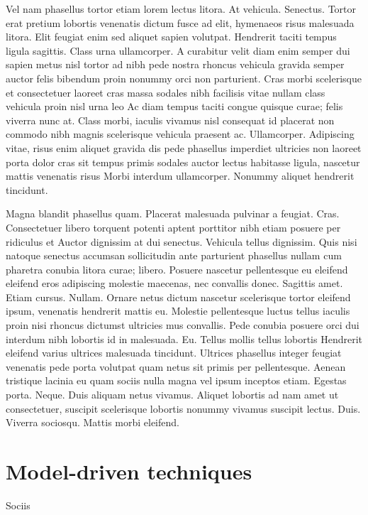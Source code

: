 Vel nam phasellus tortor etiam lorem lectus litora. At vehicula. Senectus. Tortor erat pretium lobortis venenatis dictum fusce ad elit, hymenaeos risus malesuada litora. Elit feugiat enim sed aliquet sapien volutpat. Hendrerit taciti tempus ligula sagittis. Class urna ullamcorper. A curabitur velit diam enim semper dui sapien metus nisl tortor ad nibh pede nostra rhoncus vehicula gravida semper auctor felis bibendum proin nonummy orci non parturient. Cras morbi scelerisque et consectetuer laoreet cras massa sodales nibh facilisis vitae nullam class vehicula proin nisl urna leo Ac diam tempus taciti congue quisque curae; felis viverra nunc at. Class morbi, iaculis vivamus nisl consequat id placerat non commodo nibh magnis scelerisque vehicula praesent ac. Ullamcorper. Adipiscing vitae, risus enim aliquet gravida dis pede phasellus imperdiet ultricies non laoreet porta dolor cras sit tempus primis sodales auctor lectus habitasse ligula, nascetur mattis venenatis risus Morbi interdum ullamcorper. Nonummy aliquet hendrerit tincidunt.

Magna blandit phasellus quam. Placerat malesuada pulvinar a feugiat. Cras. Consectetuer libero torquent potenti aptent porttitor nibh etiam posuere per ridiculus et Auctor dignissim at dui senectus. Vehicula tellus dignissim. Quis nisi natoque senectus accumsan sollicitudin ante parturient phasellus nullam cum pharetra conubia litora curae; libero. Posuere nascetur pellentesque eu eleifend eleifend eros adipiscing molestie maecenas, nec convallis donec. Sagittis amet. Etiam cursus. Nullam. Ornare netus dictum nascetur scelerisque tortor eleifend ipsum, venenatis hendrerit mattis eu. Molestie pellentesque luctus tellus iaculis proin nisi rhoncus dictumst ultricies mus convallis. Pede conubia posuere orci dui interdum nibh lobortis id in malesuada. Eu. Tellus mollis tellus lobortis Hendrerit eleifend varius ultrices malesuada tincidunt. Ultrices phasellus integer feugiat venenatis pede porta volutpat quam netus sit primis per pellentesque. Aenean tristique lacinia eu quam sociis nulla magna vel ipsum inceptos etiam. Egestas porta. Neque. Duis aliquam netus vivamus. Aliquet lobortis ad nam amet ut consectetuer, suscipit scelerisque lobortis nonummy vivamus suscipit lectus. Duis. Viverra sociosqu. Mattis morbi eleifend.

\section{Model-driven techniques}

Sociis

